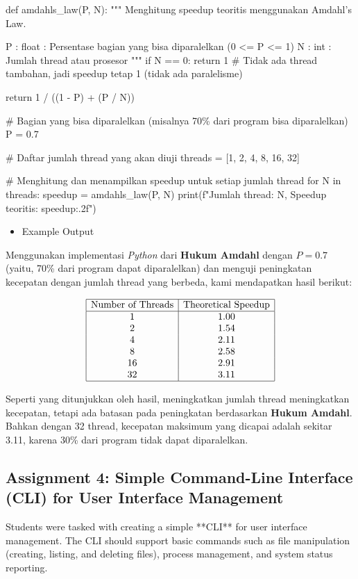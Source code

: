 \documentclass[12pt]{article}
\begin{document}
\begin{python}
def amdahls_law(P, N):
    """
    Menghitung speedup teoritis menggunakan Amdahl's Law.
    
    P : float : Persentase bagian yang bisa diparalelkan (0 <= P <= 1)
    N : int : Jumlah thread atau prosesor
    """
    if N == 0:
        return 1  # Tidak ada thread tambahan, jadi speedup tetap 1 (tidak ada paralelisme)
    
    return 1 / ((1 - P) + (P / N))

# Bagian yang bisa diparalelkan (misalnya 70\% dari program bisa diparalelkan)
P = 0.7

# Daftar jumlah thread yang akan diuji
threads = [1, 2, 4, 8, 16, 32]  

# Menghitung dan menampilkan speedup untuk setiap jumlah thread
for N in threads:
    speedup = amdahls_law(P, N)
    print(f"Jumlah thread: {N}, Speedup teoritis: {speedup:.2f}")
\end{python}

\begin{itemize}
    \item {Example Output}
\end{itemize}
Menggunakan implementasi \textit{Python} dari \textbf{Hukum Amdahl} dengan \( P = 0.7 \) (yaitu, 70\% dari program dapat diparalelkan) dan menguji peningkatan kecepatan dengan jumlah thread yang berbeda, kami mendapatkan hasil berikut:

\[
\begin{array}{|c|c|}
\hline
\text{Number of Threads} & \text{Theoretical Speedup} \\
\hline
1 & 1.00 \\
2 & 1.54 \\
4 & 2.11 \\
8 & 2.58 \\
16 & 2.91 \\
32 & 3.11 \\
\hline
\end{array}
\]

Seperti yang ditunjukkan oleh hasil, meningkatkan jumlah thread meningkatkan kecepatan, tetapi ada batasan pada peningkatan berdasarkan \textbf{Hukum Amdahl}. Bahkan dengan 32 thread, kecepatan maksimum yang dicapai adalah sekitar 3.11, karena 30\% dari program tidak dapat diparalelkan.



\subsection{Assignment 4: Simple Command-Line Interface (CLI) for User Interface Management}
Students were tasked with creating a simple **CLI** for user interface management. The CLI should support basic commands such as file manipulation (creating, listing, and deleting files), process management, and system status reporting.
\end{document}
